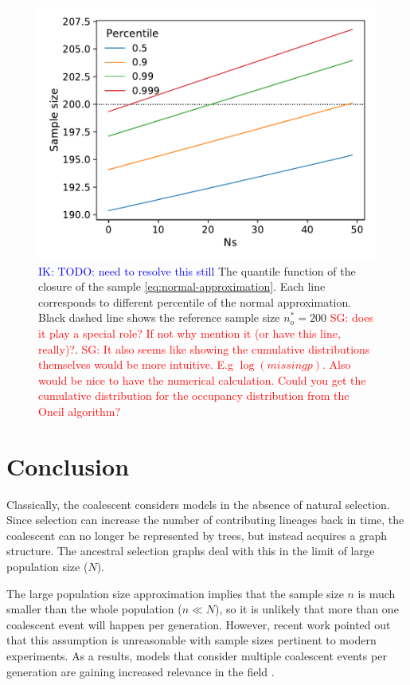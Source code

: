 \documentclass[review]{elsarticle}
\newcommand{\sgcomment}[1]{\textcolor{red}{SG: #1}}
\newcommand{\ikcomment}[1]{\textcolor{blue}{IK: #1}}
\begin{document}
\begin{figure}
  \centering
  \includegraphics[]{fig/quantile.pdf}
  \caption{\ikcomment{TODO: need to resolve this still} The quantile function of the closure of the
    sample \eqref{eq:normal-approximation}. Each line corresponds to different percentile of the
    normal approximation. Black dashed line shows the reference sample size $n_o^*=200$
    \sgcomment{does it play a special role? If not why mention it (or have this line, really)?}.
    \sgcomment{It also seems like showing the cumulative distributions themselves would be more
      intuitive. E.g $\log(missing p)$. Also would be nice to have the numerical calculation. Could
      you get the cumulative distribution for the occupancy distribution from the Oneil algorithm? }}
  \label{fig:normal-approximation}
\end{figure}


\section{Conclusion}
\label{sec:conclusion}

Classically, the coalescent considers models in the absence of natural selection. Since selection
can increase the number of contributing lineages back in time, the coalescent can no longer be
represented by trees, but instead acquires a graph structure. The ancestral selection graphs
\citep{KroneNeuhauser1997} deal with this in the limit of large population size ($N$).

The large population size approximation implies that the sample size $n$ is much smaller than the
whole population ($n \ll N$), so it is unlikely that more than one coalescent event will happen per
generation. However, recent work \citep{BhaskarEtAl2014,NelsonEtAl2019} pointed out that this
assumption is unreasonable with sample sizes pertinent to modern experiments. As a results, models
that consider multiple coalescent events per generation are gaining increased relevance in the
field \citep{FlemmingtonVoit}.
\end{document}
